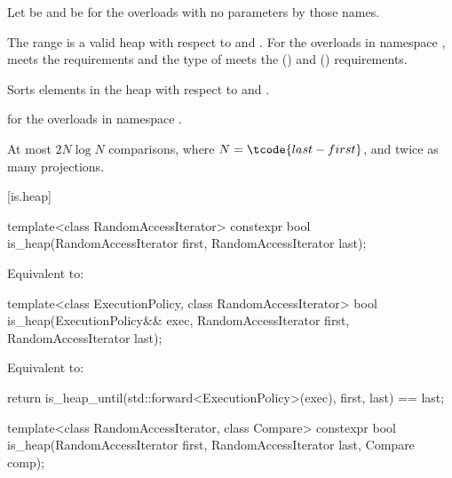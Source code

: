 \begin{itemdescr}
\pnum
Let  be 
and  be 
for the overloads with no parameters by those names.

\pnum
\expects
The range  is
a valid heap with respect to  and .
For the overloads in namespace ,
 meets
the  requirements and
the type of  meets
the  () and
 () requirements.

\pnum
\effects
Sorts elements in the heap 
with respect to  and .

\pnum
\returns
{} for the overloads in namespace .

\pnum
\complexity
At most $2N \log N$ comparisons, where $N = \tcode{last - first}$, and
twice as many projections.
\end{itemdescr}

[is.heap]{}

%
\begin{itemdecl}
template<class RandomAccessIterator>
  constexpr bool is_heap(RandomAccessIterator first, RandomAccessIterator last);
\end{itemdecl}

\begin{itemdescr}
\pnum
\effects
Equivalent to: 
\end{itemdescr}

%
\begin{itemdecl}
template<class ExecutionPolicy, class RandomAccessIterator>
  bool is_heap(ExecutionPolicy&& exec,
               RandomAccessIterator first, RandomAccessIterator last);
\end{itemdecl}

\begin{itemdescr}
\pnum
\effects
Equivalent to:
\begin{codeblock}
return is_heap_until(std::forward<ExecutionPolicy>(exec), first, last) == last;
\end{codeblock}
\end{itemdescr}

%
\begin{itemdecl}
template<class RandomAccessIterator, class Compare>
  constexpr bool is_heap(RandomAccessIterator first, RandomAccessIterator last,
                         Compare comp);
\end{itemdecl}

